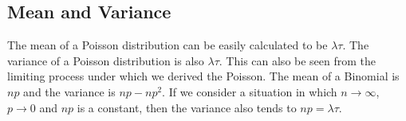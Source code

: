 \subsection{Mean and Variance}
The mean of a Poisson distribution can be easily calculated to be $\lambda \tau$. The variance of a Poisson distribution is also $\lambda \tau$.
This can also be seen from the limiting process under which we derived the Poisson. The mean of a Binomial is $np$ and the variance is $np - np^2$.
If we consider a situation in which $n \to \infty$, $p \to 0$ and $np$ is a constant, then the variance also tends to $np = \lambda \tau$.

